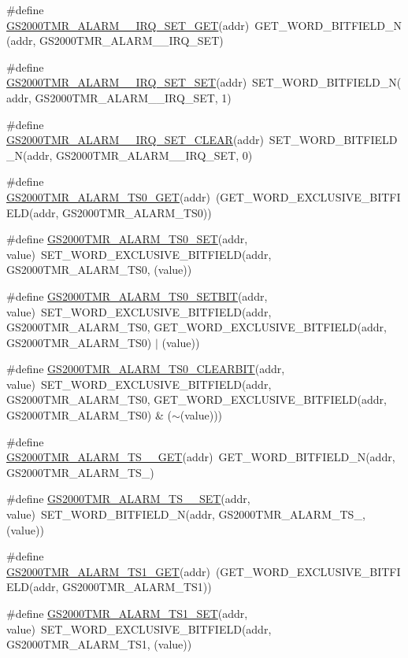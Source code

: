 \begin{DoxyCompactItemize}
\item 
\#define \hyperlink{a00555_a46e2dfaec49d948329540f82189da2cb}{GS2000TMR\_\-ALARM\_\_\-IRQ\_\-SET\_\-GET}(addr)~GET\_\-WORD\_\-BITFIELD\_\-N(addr, GS2000TMR\_\-ALARM\_\_\-IRQ\_\-SET)
\item 
\#define \hyperlink{a00555_ab92ceedc02e6ac401aa7916dc14f2631}{GS2000TMR\_\-ALARM\_\_\-IRQ\_\-SET\_\-SET}(addr)~SET\_\-WORD\_\-BITFIELD\_\-N(addr, GS2000TMR\_\-ALARM\_\_\-IRQ\_\-SET, 1)
\item 
\#define \hyperlink{a00555_a201a1e3028df5f22b0bd1e9aa38d3f7b}{GS2000TMR\_\-ALARM\_\_\-IRQ\_\-SET\_\-CLEAR}(addr)~SET\_\-WORD\_\-BITFIELD\_\-N(addr, GS2000TMR\_\-ALARM\_\_\-IRQ\_\-SET, 0)
\item 
\#define \hyperlink{a00555_a69babd82355c0e6d14e175fd366e2189}{GS2000TMR\_\-ALARM\_\-TS0\_\-GET}(addr)~(GET\_\-WORD\_\-EXCLUSIVE\_\-BITFIELD(addr, GS2000TMR\_\-ALARM\_\-TS0))
\item 
\#define \hyperlink{a00555_aa274513a0957fc48af939cde4d6ce2e8}{GS2000TMR\_\-ALARM\_\-TS0\_\-SET}(addr, value)~SET\_\-WORD\_\-EXCLUSIVE\_\-BITFIELD(addr, GS2000TMR\_\-ALARM\_\-TS0, (value))
\item 
\#define \hyperlink{a00555_ab4f49a212d1033171dbc19333fe50675}{GS2000TMR\_\-ALARM\_\-TS0\_\-SETBIT}(addr, value)~SET\_\-WORD\_\-EXCLUSIVE\_\-BITFIELD(addr, GS2000TMR\_\-ALARM\_\-TS0, GET\_\-WORD\_\-EXCLUSIVE\_\-BITFIELD(addr, GS2000TMR\_\-ALARM\_\-TS0) $|$ (value))
\item 
\#define \hyperlink{a00555_afce3dd1d7c06427ae614bd602e8238f6}{GS2000TMR\_\-ALARM\_\-TS0\_\-CLEARBIT}(addr, value)~SET\_\-WORD\_\-EXCLUSIVE\_\-BITFIELD(addr, GS2000TMR\_\-ALARM\_\-TS0, GET\_\-WORD\_\-EXCLUSIVE\_\-BITFIELD(addr, GS2000TMR\_\-ALARM\_\-TS0) \& ($\sim$(value)))
\item 
\#define \hyperlink{a00555_a26b933f71989890fa8a379be04c5ca5e}{GS2000TMR\_\-ALARM\_\-TS\_\_\-GET}(addr)~GET\_\-WORD\_\-BITFIELD\_\-N(addr, GS2000TMR\_\-ALARM\_\-TS\_)
\item 
\#define \hyperlink{a00555_a86bb344f93d0bc2a3a4cac0ecd684c13}{GS2000TMR\_\-ALARM\_\-TS\_\_\-SET}(addr, value)~SET\_\-WORD\_\-BITFIELD\_\-N(addr, GS2000TMR\_\-ALARM\_\-TS\_, (value))
\item 
\#define \hyperlink{a00555_a79f865dd53325ea633f73aad291ce514}{GS2000TMR\_\-ALARM\_\-TS1\_\-GET}(addr)~(GET\_\-WORD\_\-EXCLUSIVE\_\-BITFIELD(addr, GS2000TMR\_\-ALARM\_\-TS1))
\item 
\#define \hyperlink{a00555_ae2adf63ab307de794a504db442bafa2b}{GS2000TMR\_\-ALARM\_\-TS1\_\-SET}(addr, value)~SET\_\-WORD\_\-EXCLUSIVE\_\-BITFIELD(addr, GS2000TMR\_\-ALARM\_\-TS1, (value))

\end{DoxyCompactItemize}
